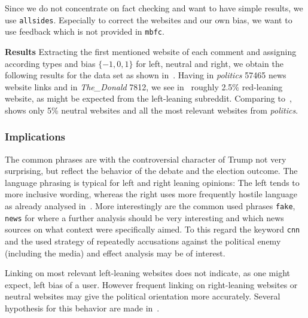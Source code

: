 \documentclass[runningheads,a4paper]{llncs}
\begin{document}
	Since we do not concentrate on fact checking and want to have simple results, we use \texttt{allsides}. Especially to correct the websites and our own bias, we want to use feedback which is not provided in \texttt{mbfc}.\par
	\textbf{Results} Extracting the first mentioned website of each comment and assigning according types and bias $\{-1,0,1\}$ for left, neutral and right, we obtain the following results for the data set as shown in~.
	Having in \textit{politics} 57465 news website links and in \textit{The\_Donald} 7812, we see in~ roughly 2.5\% red-leaning website, as might be expected from the left-leaning subreddit.
	Comparing to~,~ shows only 5\% neutral websites and all the most relevant websites from \textit{politics}.
	\subsubsection{Implications}
	The common phrases are with the controversial character of Trump not very surprising, but reflect the behavior of the debate and the election outcome. The language phrasing is typical for left and right leaning opinions: The left tends to more inclusive wording, whereas the right uses more frequently hostile language as already analysed in~\cite{nithyanand2017online}.
	More interestingly are the common used phrases \texttt{fake}, \texttt{news} for where a further analysis should be very interesting and which news sources on what context were specifically aimed.
	To this regard the keyword \texttt{cnn} and the used strategy of repeatedly accusations against the political enemy (including the media) and effect analysis may be of interest.\par
	Linking on most relevant left-leaning websites does not indicate, as one might expect, left bias of a user. However frequent linking on right-leaning websites or neutral websites may give the political orientation more accurately. Several hypothesis for this behavior are made in~.
\end{document}
